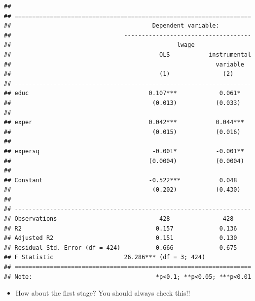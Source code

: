 \documentclass[]{book}
\providecommand{\tightlist}{%
  \setlength{\itemsep}{0pt}\setlength{\parskip}{0pt}}
\begin{document}
\begin{verbatim}
## 
## ===================================================================
##                                        Dependent variable:         
##                                ------------------------------------
##                                               lwage                
##                                          OLS           instrumental
##                                                          variable  
##                                          (1)               (2)     
## -------------------------------------------------------------------
## educ                                  0.107***            0.061*   
##                                        (0.013)           (0.033)   
##                                                                    
## exper                                 0.042***           0.044***  
##                                        (0.015)           (0.016)   
##                                                                    
## expersq                                -0.001*           -0.001**  
##                                       (0.0004)           (0.0004)  
##                                                                    
## Constant                              -0.522***           0.048    
##                                        (0.202)           (0.430)   
##                                                                    
## -------------------------------------------------------------------
## Observations                             428               428     
## R2                                      0.157             0.136    
## Adjusted R2                             0.151             0.130    
## Residual Std. Error (df = 424)          0.666             0.675    
## F Statistic                    26.286*** (df = 3; 424)             
## ===================================================================
## Note:                                   *p<0.1; **p<0.05; ***p<0.01
\end{verbatim}

\begin{itemize}
\tightlist
\item
  How about the first stage? You should always check this!!
\end{itemize}
\end{document}
